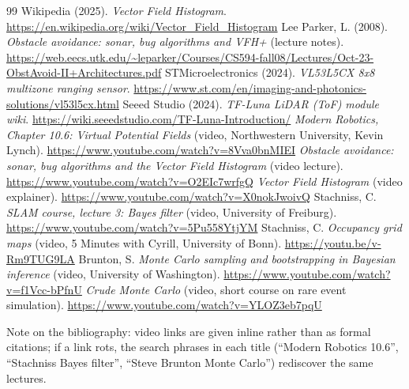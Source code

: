 \begin{thebibliography}{99}
 Wikipedia (2025). \emph{Vector Field Histogram}.
\url{https://en.wikipedia.org/wiki/Vector_Field_Histogram}
 Lee Parker, L. (2008). \emph{Obstacle avoidance: sonar, bug
algorithms and VFH+} (lecture notes).
\url{https://web.eecs.utk.edu/~leparker/Courses/CS594-fall08/Lectures/Oct-23-ObstAvoid-II+Architectures.pdf}
 STMicroelectronics (2024). \emph{VL53L5CX 8x8 multizone
ranging sensor}.
\url{https://www.st.com/en/imaging-and-photonics-solutions/vl53l5cx.html}
 Seeed Studio (2024). \emph{TF-Luna LiDAR (ToF) module wiki}.
\url{https://wiki.seeedstudio.com/TF-Luna-Introduction/}
 \emph{Modern Robotics, Chapter 10.6: Virtual Potential
Fields} (video, Northwestern University, Kevin Lynch).
\url{https://www.youtube.com/watch?v=8Vva0bnMIEI}
 \emph{Obstacle avoidance: sonar, bug algorithms and the
Vector Field Histogram} (video lecture).
\url{https://www.youtube.com/watch?v=O2EIc7wrfgQ}
 \emph{Vector Field Histogram} (video explainer).
\url{https://www.youtube.com/watch?v=X0nokJwoivQ}
 Stachniss, C. \emph{SLAM course, lecture 3: Bayes
filter} (video, University of Freiburg).
\url{https://www.youtube.com/watch?v=5Pu558YtjYM}
 Stachniss, C. \emph{Occupancy grid maps} (video, 5
Minutes with Cyrill, University of Bonn). \url{https://youtu.be/v-Rm9TUG9LA}
 Brunton, S. \emph{Monte Carlo sampling and bootstrapping
in Bayesian inference} (video, University of Washington).
\url{https://www.youtube.com/watch?v=f1Vcc-bPfnU}
 \emph{Crude Monte Carlo} (video, short course on rare
event simulation). \url{https://www.youtube.com/watch?v=YLOZ3eb7pqU}
\end{thebibliography}

\noindent Note on the bibliography: video links are given inline rather than
as formal citations; if a link rots, the search phrases in each title
(``Modern Robotics 10.6'', ``Stachniss Bayes filter'', ``Steve Brunton Monte
Carlo'') rediscover the same lectures.
